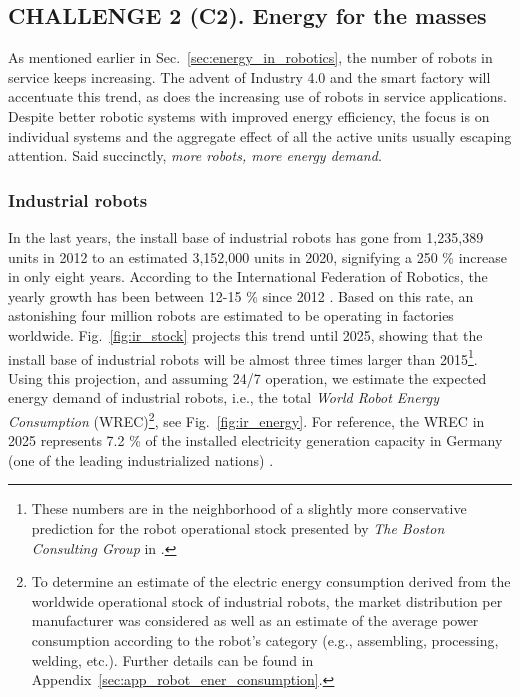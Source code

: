 \subsection{\textbf{CHALLENGE 2} (C2). Energy for the masses}\label{sec:robots_challenge}
As mentioned earlier in Sec.~\ref{sec:energy_in_robotics}, the number of robots in service keeps increasing. The advent of Industry 4.0 and the smart factory will accentuate this trend, as does the increasing use of robots in service applications. Despite better robotic systems with improved energy efficiency, the focus is on individual systems and the aggregate effect of all the active units usually escaping attention. Said succinctly, \emph{more robots, more energy demand}.

\subsubsection{Industrial robots}
In the last years, the install base of industrial robots has gone from 1,235,389 units in 2012 to an estimated 3,152,000 units in 2020, signifying a 250 \% increase in only eight years. According to the International Federation of Robotics, the yearly growth has been between 12-15 \% since 2012 \cite{IFR2019}. Based on this rate, an astonishing four million robots are estimated to be operating in factories worldwide. Fig.~\ref{fig:ir_stock} projects this trend until 2025, showing that the install base of industrial robots will be almost three times larger than 2015\footnote{These numbers are in the neighborhood of a slightly more conservative prediction for the robot operational stock presented by \textit{The Boston Consulting Group} in \cite{sirkin2015}.}. Using this projection, and assuming 24/7 operation, we estimate the expected energy demand of industrial robots, i.e., the total \textit{World Robot Energy Consumption} (WREC)\footnote{To determine an estimate of the electric energy consumption derived from the worldwide operational stock of industrial robots, the market distribution per manufacturer was considered as well as an estimate of the average power consumption according to the robot's category (e.g., assembling, processing, welding, etc.). Further details can be found in Appendix~\ref{sec:app_robot_ener_consumption}.}, see Fig.~\ref{fig:ir_energy}. For reference, the WREC in 2025 represents 7.2 \% of the installed electricity generation capacity in Germany (one of the leading industrialized nations) \cite{fraunhofer2016}. 

